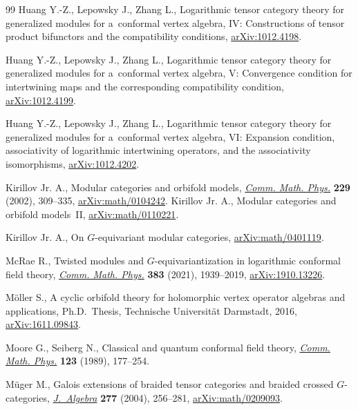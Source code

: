 \begin{thebibliography}{99}
Huang Y.-Z., Lepowsky J., Zhang L., Logarithmic tensor category theory for
 generalized modules for a~conformal vertex algebra, {IV}: {C}onstructions of
 tensor product bifunctors and the compatibility conditions,
 \href{https://arxiv.org/abs/1012.4198}{arXiv:1012.4198}.

Huang Y.-Z., Lepowsky J., Zhang L., Logarithmic tensor category theory for
 generalized modules for a~conformal vertex algebra, {V}: {C}onvergence
 condition for intertwining maps and the corresponding compatibility
 condition, \href{https://arxiv.org/abs/1012.4199}{arXiv:1012.4199}.

Huang Y.-Z., Lepowsky J., Zhang L., Logarithmic tensor category theory for
 generalized modules for a~conformal vertex algebra, {VI}: {E}xpansion
 condition, associativity of logarithmic intertwining operators, and the
 associativity isomorphisms,
 \href{https://arxiv.org/abs/1012.4202}{arXiv:1012.4202}.

Kirillov Jr. A., Modular categories and orbifold models,
 \href{https://doi.org/10.1007/s002200200650}{\textit{Comm. Math. Phys.}}
 \textbf{229} (2002), 309--335,
 \href{https://arxiv.org/abs/math/0104242}{arXiv:math/0104242}.
Kirillov Jr. A., Modular categories and orbifold models~{II},
 \href{https://arxiv.org/abs/math/0110221}{arXiv:math/0110221}.

Kirillov Jr. A., On $G$-equivariant modular categories,
 \href{https://arxiv.org/abs/math/0401119}{arXiv:math/0401119}.

McRae R., Twisted modules and {$G$}-equivariantization in logarithmic conformal
 field theory, \href{https://doi.org/10.1007/s00220-020-03882-2}{\textit{Comm.
 Math. Phys.}} \textbf{383} (2021), 1939--2019,
 \href{https://arxiv.org/abs/1910.13226}{arXiv:1910.13226}.

M\"oller S., A cyclic orbifold theory for holomorphic vertex operator algebras
 and applications, Ph.D.~Thesis, {T}echnische Universit\"{a}t Darmstadt, 2016,
 \href{https://arxiv.org/abs/1611.09843}{arXiv:1611.09843}.

Moore G., Seiberg N., Classical and quantum conformal field theory,
 \href{https://doi.org/10.1007/BF01238857}{\textit{Comm. Math. Phys.}}
 \textbf{123} (1989), 177--254.

M\"uger M., Galois extensions of braided tensor categories and braided crossed
 {$G$}-categories,
 \href{https://doi.org/10.1016/j.jalgebra.2004.02.026}{\textit{J.~Algebra}}
 \textbf{277} (2004), 256--281,
 \href{https://arxiv.org/abs/math/0209093}{arXiv:math/0209093}.


\end{thebibliography}
